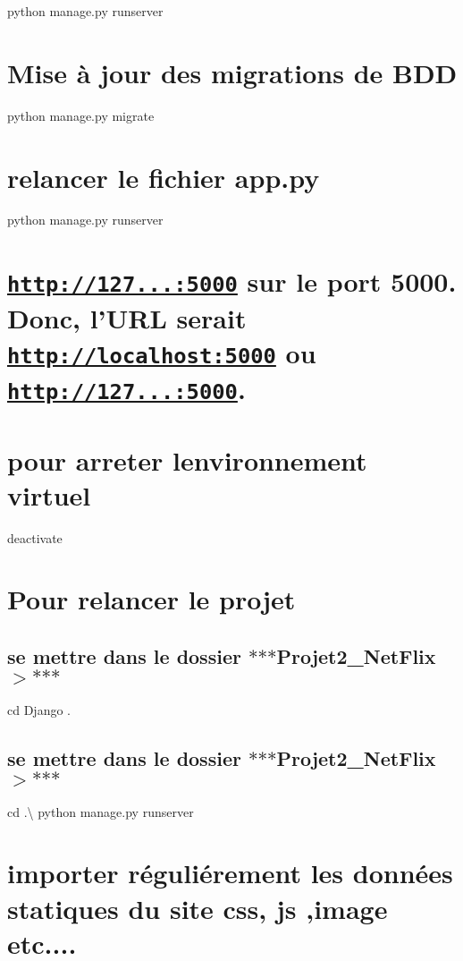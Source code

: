 python manage.\+py runserver

\section*{Mise à jour des migrations de B\+DD}

python manage.\+py migrate

\section*{relancer le fichier app.\+py}

python manage.\+py runserver

\section*{\href{http://127.0.0.1:5000}{\tt http\+://127...\+:5000} sur le port 5000. Donc, l’\+U\+RL serait \href{http://localhost:5000}{\tt http\+://localhost\+:5000} ou \href{http://127.0.0.1:5000}{\tt http\+://127...\+:5000}.}

\section*{pour arreter l\textquotesingle{}environnement virtuel}

deactivate

\section*{Pour relancer le projet}

\subsection*{se mettre dans le dossier $\ast$$\ast$$\ast$\+Projet2\+\_\+\+Net\+Flix$>$$\ast$$\ast$$\ast$}

cd Django . \subsection*{se mettre dans le dossier $\ast$$\ast$$\ast$\+Projet2\+\_\+\+Net\+Flix$>$$\ast$$\ast$$\ast$}

cd .\textbackslash{} python manage.\+py runserver

\section*{importer réguliérement les données statiques du site css, js ,image etc....}

